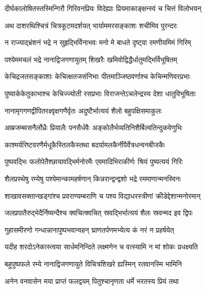 
\twolineshloka
{दीर्घकालोषितस्तस्मिन्गिरौ गिरिवनप्रियः}
{विदेह्याः प्रियमाकाङ्क्षन्स्वं च चित्तं विलोभयन्} %

\twolineshloka
{अथ दाशरथिश्चित्रं चित्रकूटमदर्शयत्}
{भार्याममरसङ्काशः शचीमिव पुरन्दरः} %

\twolineshloka
{न राज्याद्भ्रंशनं भद्रे न सुहृद्भिर्विनाभवः}
{मनो मे बाधते दृष्ट्वा रमणीयमिमं गिरिम्} %

\twolineshloka
{पश्येममचलं भद्रे नानाद्विजगणायुतम्}
{शिखरैः खमिवोद्विद्धैर्धातुमद्भिर्विभूषितम्} %

\twolineshloka
{केचिद्रजतसङ्काशाः केचित्क्षतजसंनिभाः}
{पीतमाञ्जिष्ठवर्णाश्च केचिन्मणिवरप्रभाः} %

\twolineshloka
{पुष्यार्ककेतुकाभाश्च केचिज्ज्योती रसप्रभाः}
{विराजन्तेऽचलेन्द्रस्य देशा धातुविभूषिताः} %

\twolineshloka
{नानामृगगणद्वीपितरक्ष्वृक्षगणैर्वृतः}
{अदुष्टैर्भात्ययं शैलो बहुपक्षिसमाकुलः} %

\twolineshloka
{आम्रजम्ब्वसनैर्लोध्रैः प्रियालैः पनसैर्धवैः}
{अङ्कोलैर्भव्यतिनिशैर्बिल्वतिन्दुकवेणुभिः} %

\twolineshloka
{काश्मर्यरिष्टवरणैर्मधूकैस्तिलकैस्तथा}
{बदर्यामलकैर्नीपैर्वेत्रधन्वनबीजकैः} %

\twolineshloka
{पुष्पवद्भिः फलोपेतैश्छायावद्भिर्मनोरमैः}
{एवमादिभिराकीर्णः श्रियं पुष्यत्ययं गिरिः} %

\twolineshloka
{शैलप्रस्थेषु रम्येषु पश्येमान्कामहर्षणान्}
{किन्नरान्द्वन्द्वशो भद्रे रममाणान्मनस्विनः} %

\twolineshloka
{शाखावसक्तान्खड्गांश्च प्रवराण्यम्बराणि च}
{पश्य विद्याधरस्त्रीणां क्रीडेद्देशान्मनोरमान्} %

\twolineshloka
{जलप्रपातैरुद्भेदैर्निष्यन्दैश्च क्वचित्क्वचित्}
{स्रवद्भिर्भात्ययं शैलः स्रवन्मद इव द्विपः} %

\twolineshloka
{गुहासमीरणो गन्धान्नानापुष्पभवान्वहन्}
{घ्राणतर्पणमभ्येत्य कं नरं न प्रहर्षयेत्} %

\twolineshloka
{यदीह शरदोऽनेकास्त्वया सार्धमनिन्दिते}
{लक्ष्मणेन च वत्स्यामि न मां शोकः प्रधक्ष्यति} %

\twolineshloka
{बहुपुष्पफले रम्ये नानाद्विजगणायुते}
{विचित्रशिखरे ह्यस्मिन् रतवानस्मि भामिनि} %

\twolineshloka
{अनेन वनवासेन मया प्राप्तं फलद्वयम्}
{पितुश्चानृणता धर्मे भरतस्य प्रियं तथा} %

